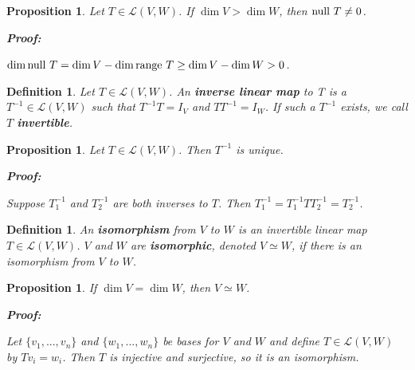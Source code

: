 \documentclass{article}
\theoremstyle{colontheorem}
\newtheorem{proposition}[theorem]{Proposition}
\newtheorem{definition}[theorem]{Definition}
\newcommand{\Null}{\textnormal{null }}
\newcommand{\Range}{\textnormal{range }}
\newenvironment{Proposition}
{
	\begin{mdframed}[backgroundcolor=TheoremOrange!10]
	\begin{proposition}
}
{
	\end{proposition}
	\end{mdframed}
	
	\vspace{.15in}
}
\newenvironment{Def}
{
	\begin{mdframed}[backgroundcolor=DefGreen!10]
	\begin{definition}
}
{
	\end{definition}
	\end{mdframed}
	
	\vspace{.15in}
}
\newenvironment{Proof}
{
	\begin{mdframed}[backgroundcolor=ProofPurple!10]
	\textbf{Proof:}%
}
{
	\end{mdframed}
	
	\vspace{.085in}
}
\begin{document}
\begin{Proposition}
	
	Let $T \in \mathcal{L}(V,W)$. If $\dim V > \dim W$, then $\Null T \neq 0$.
	
	\begin{Proof}
		$\dim \Null T = \dim V - \dim \Range T \geq \dim V - \dim W > 0$.
		
	\end{Proof}
	
\end{Proposition}



\begin{Def}
	
	Let $T \in \mathcal{L}(V,W)$. An \textbf{inverse linear map} to T is a $T^{-1} \in \mathcal{L}(V,W)$ such that $T^{-1}T = I_V$ and $TT^{-1} = I_W$. If such a $T^{-1}$ exists, we call $T$ \textbf{invertible}.
	
\end{Def}



\begin{Proposition}
	
	Let $T \in \mathcal{L}(V,W)$. Then $T^{-1}$ is unique.
	
	\begin{Proof}
		Suppose $T^{-1}_1$ and $T^{-1}_2$ are both inverses to $T$. Then $T^{-1}_1 = T^{-1}_1 T T^{-1}_2 = T^{-1}_2$.
		
	\end{Proof}
	
\end{Proposition}



\begin{Def}
	
	An \textbf{isomorphism} from $V$ to $W$ is an invertible linear map $T \in \mathcal{L}(V,W)$. $V$ and $W$ are \textbf{isomorphic}, denoted $V \simeq W$, if there is an isomorphism from $V$ to $W$.
	
\end{Def}



\begin{Proposition}
	
	If $\dim V = \dim W$, then $V \simeq W$.
	
	\begin{Proof}
		Let $\{v_1, ..., v_n\}$ and $\{w_1, ..., w_n\}$ be bases for $V$ and $W$ and define $T \in \mathcal{L}(V,W)$ by $Tv_i = w_i$. Then $T$ is injective and surjective, so it is an isomorphism.
		
	\end{Proof}
	
\end{Proposition}
\end{document}
